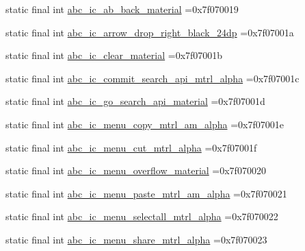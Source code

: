 \begin{DoxyCompactItemize}
\item 
static final int \mbox{\hyperlink{classbr_1_1unb_1_1cic_1_1mp_1_1marketmaster_1_1test_1_1R_1_1drawable_a65c85f9ddaa8acac47492126cc50bca1}{abc\+\_\+ic\+\_\+ab\+\_\+back\+\_\+material}} =0x7f070019
\item 
static final int \mbox{\hyperlink{classbr_1_1unb_1_1cic_1_1mp_1_1marketmaster_1_1test_1_1R_1_1drawable_a1259cdd6f234fcf39da526c637b12082}{abc\+\_\+ic\+\_\+arrow\+\_\+drop\+\_\+right\+\_\+black\+\_\+24dp}} =0x7f07001a
\item 
static final int \mbox{\hyperlink{classbr_1_1unb_1_1cic_1_1mp_1_1marketmaster_1_1test_1_1R_1_1drawable_aabef5508400481099bdba9daaea67953}{abc\+\_\+ic\+\_\+clear\+\_\+material}} =0x7f07001b
\item 
static final int \mbox{\hyperlink{classbr_1_1unb_1_1cic_1_1mp_1_1marketmaster_1_1test_1_1R_1_1drawable_a8488e447919cd5cdda71c0a4a1049d4b}{abc\+\_\+ic\+\_\+commit\+\_\+search\+\_\+api\+\_\+mtrl\+\_\+alpha}} =0x7f07001c
\item 
static final int \mbox{\hyperlink{classbr_1_1unb_1_1cic_1_1mp_1_1marketmaster_1_1test_1_1R_1_1drawable_af197fd7dc604a06a68bede7f5cbdd2ce}{abc\+\_\+ic\+\_\+go\+\_\+search\+\_\+api\+\_\+material}} =0x7f07001d
\item 
static final int \mbox{\hyperlink{classbr_1_1unb_1_1cic_1_1mp_1_1marketmaster_1_1test_1_1R_1_1drawable_a6b6826f471913b8cc19927be07dbba06}{abc\+\_\+ic\+\_\+menu\+\_\+copy\+\_\+mtrl\+\_\+am\+\_\+alpha}} =0x7f07001e
\item 
static final int \mbox{\hyperlink{classbr_1_1unb_1_1cic_1_1mp_1_1marketmaster_1_1test_1_1R_1_1drawable_aa65077f8bc161f4da3d42db3ca69b4dd}{abc\+\_\+ic\+\_\+menu\+\_\+cut\+\_\+mtrl\+\_\+alpha}} =0x7f07001f
\item 
static final int \mbox{\hyperlink{classbr_1_1unb_1_1cic_1_1mp_1_1marketmaster_1_1test_1_1R_1_1drawable_a0f14d6f1fb6df75bf7b3b94bf8cf36d8}{abc\+\_\+ic\+\_\+menu\+\_\+overflow\+\_\+material}} =0x7f070020
\item 
static final int \mbox{\hyperlink{classbr_1_1unb_1_1cic_1_1mp_1_1marketmaster_1_1test_1_1R_1_1drawable_a56bc0e10fa2de7b24bc721094095f648}{abc\+\_\+ic\+\_\+menu\+\_\+paste\+\_\+mtrl\+\_\+am\+\_\+alpha}} =0x7f070021
\item 
static final int \mbox{\hyperlink{classbr_1_1unb_1_1cic_1_1mp_1_1marketmaster_1_1test_1_1R_1_1drawable_a3b347948b56ca418b631598f9c71f420}{abc\+\_\+ic\+\_\+menu\+\_\+selectall\+\_\+mtrl\+\_\+alpha}} =0x7f070022
\item 
static final int \mbox{\hyperlink{classbr_1_1unb_1_1cic_1_1mp_1_1marketmaster_1_1test_1_1R_1_1drawable_a88d4baaae21df7657da1cca70d9a22c8}{abc\+\_\+ic\+\_\+menu\+\_\+share\+\_\+mtrl\+\_\+alpha}} =0x7f070023

\end{DoxyCompactItemize}
